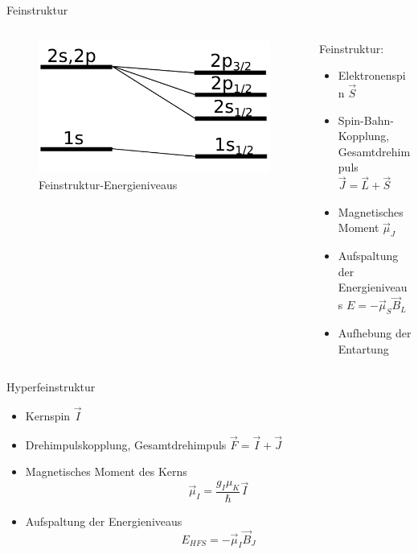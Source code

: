 \documentclass{beamer}
\begin{document}
\begin{frame}{Feinstruktur}
\begin{columns}
\begin{column}{4.5cm}
	\begin{figure}[H]
	\centering \includegraphics[width=\textwidth]{Bilder/feinstruktur.pdf}
	\caption{Feinstruktur-Energieniveaus}
	\end{figure}
\end{column}
\begin{column}{5.5cm}
Feinstruktur:
\begin{itemize}
	\item Elektronenspin $\vec S$
	\item Spin-Bahn-Kopplung, Gesamtdrehimpuls $\vec J = \vec L + \vec S$
	\item Magnetisches Moment $\vec\mu_J$
	\item Aufspaltung der Energieniveaus $E=-\vec\mu_S\vec B_L$
	\item Aufhebung der Entartung
\end{itemize}
\end{column}
\end{columns}
\end{frame}


\begin{frame}{Hyperfeinstruktur}
\begin{itemize}
\item Kernspin $\vec I$
\item Drehimpulskopplung, Gesamtdrehimpuls $\vec F = \vec I + \vec J$
\item Magnetisches Moment des Kerns $$\vec \mu_I = \frac{g_I\mu_K}{\hbar} \vec I $$
\item Aufspaltung der Energieniveaus $$E_{HFS} = -\vec\mu_I\vec B_J$$
\end{itemize}
\end{frame}
\end{document}
